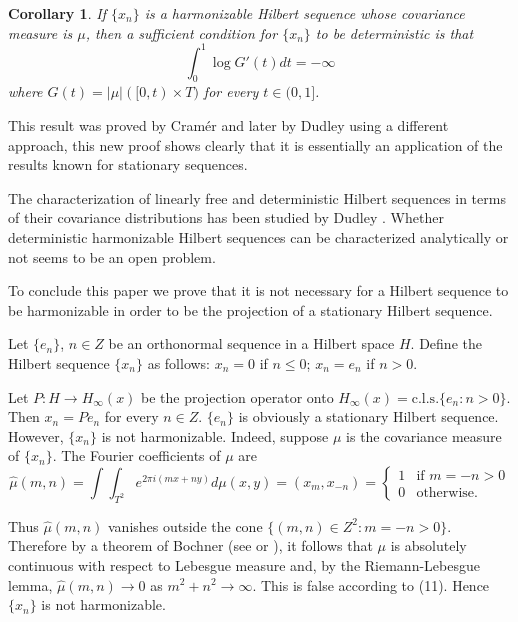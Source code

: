 \documentclass{article}
\newtheorem{corollary}{Corollary}
\begin{document}
\begin{corollary}
If $\{x_n\}$ is a harmonizable Hilbert sequence whose covariance
measure is $\mu$, then a sufficient condition for $\{x_n\}$ to be deterministic is that
\begin{equation}
\int_0^1 \log G'(t) dt = -\infty
\end{equation}
where $G(t) = |\mu|([0, t) \times T)$ for every $t \in (0, 1]$.
\end{corollary}

This result was proved by Cramér \cite{cramer1, cramer2} and later by Dudley \cite{dudley} using a
different approach, this new proof shows clearly that it is essentially an application of the results known for stationary sequences.

The characterization of linearly free and deterministic Hilbert sequences in
terms of their covariance distributions has been studied by Dudley \cite{dudley}. Whether
deterministic harmonizable Hilbert sequences can be characterized analytically
or not seems to be an open problem.

To conclude this paper we prove that it is not necessary for a Hilbert sequence
to be harmonizable in order to be the projection of a stationary Hilbert sequence.

Let $\{e_n\}$, $n \in Z$ be an orthonormal sequence in a Hilbert space $H$. Define the
Hilbert sequence $\{x_n\}$ as follows: $x_n = 0$ if $n \leq 0$; $x_n = e_n$ if $n > 0$.

Let $P:H \to H_{\infty}(x)$ be the projection operator onto $H_{\infty}(x) = \text{c.l.s.}\{e_n:n > 0\}$.
Then $x_n = Pe_n$ for every $n \in Z$. $\{e_n\}$ is obviously a stationary Hilbert sequence.
However, $\{x_n\}$ is not harmonizable. Indeed, suppose $\mu$ is the covariance measure
of $\{x_n\}$. The Fourier coefficients of $\mu$ are
\begin{equation}
\hat{\mu}(m, n) = \int \int_{T^2} e^{2\pi i(mx+ny)} d\mu(x, y) = (x_m, x_{-n}) =
\begin{cases}
1 & \text{if } m=-n > 0 \\
0 & \text{otherwise}.
\end{cases}
\end{equation}

Thus $\hat{\mu}(m, n)$ vanishes outside the cone $\{(m, n) \in Z^2:m = -n > 0\}$. Therefore
by a theorem of Bochner (see \cite{helson} or \cite{bochner}), it follows that $\mu$ is absolutely continuous
with respect to Lebesgue measure and, by the Riemann-Lebesgue lemma,
$\hat{\mu}(m, n) \to 0$ as $m^2 + n^2 \to \infty$. This is false according to (11).
Hence $\{x_n\}$ is not harmonizable.
\end{document}
